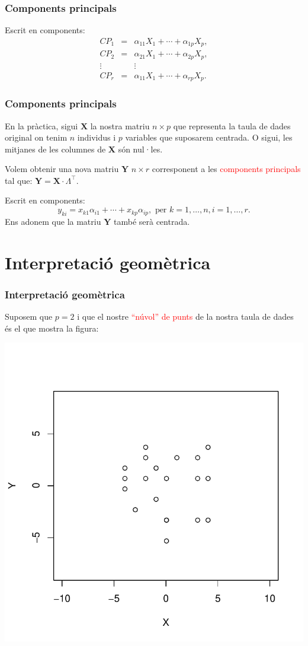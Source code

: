 \documentclass[12pt,t]{beamer}
\newcommand{\red}[1]{\textcolor{red}{#1}}
\theoremstyle{plain}
\theoremstyle{definition}
\begin{document}
\begin{frame}
\frametitle{Components principals}
Escrit en components:
\begin{eqnarray*}
CP_1 &=& \alpha_{11} X_1+\cdots + \alpha_{1p} X_p, \\
CP_2 &=& \alpha_{21} X_1+\cdots + \alpha_{2p} X_p, \\
\vdots && \vdots \\
CP_r &=& \alpha_{11} X_1+\cdots + \alpha_{rp} X_p.
\end{eqnarray*}
\end{frame}

\begin{frame}
\frametitle{Components principals}
En la pràctica, sigui $\mathbf{X}$ la nostra matriu $n\times p$ que representa la taula de dades original on tenim $n$ individus i $p$ variables que suposarem centrada. O sigui, les mitjanes de les columnes de $\mathbf{X}$ són nul·les.
\bigskip

Volem obtenir una nova matriu $\mathbf{Y}$ $n\times r$ corresponent a les \red{components principals} tal que: $\mathbf{Y}=\mathbf{X}\cdot \Lambda^\top.$
\medskip

Escrit en components:
\[
y_{ki}=x_{k1} \alpha_{i1}+\cdots +x_{kp}\alpha_{ip},\mbox{ per } k=1,\ldots,n,i=1,\ldots, r.
\]
Ens adonem que la matriu $\mathbf{Y}$ també serà centrada.
\end{frame}

\section{Interpretació geomètrica}

\begin{frame}[fragile]
\frametitle{Interpretació geomètrica}
Suposem que $p=2$ i que el nostre \red{``núvol'' de punts} de la nostra taula de dades és el que mostra la figura:
\vspace*{-1cm}

\includegraphics{ACP-001}
\end{frame}
\end{document}
